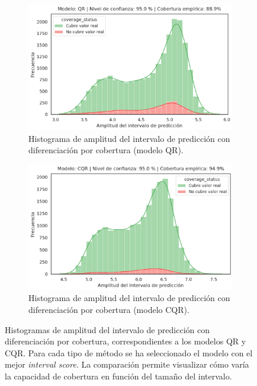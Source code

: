 \begin{figure}[htbp]
    \centering

    \begin{subfigure}[b]{0.8\textwidth}
        \centering
        \includegraphics[width=\textwidth]{capitulos/cap_05/imagenes/AE_histogram_EC_by_PIW_QR.png}
        \caption{
            Histograma de amplitud del intervalo de predicción con diferenciación por cobertura (modelo QR).
        }
        \label{fig:AE_EC_by_PIW_QR}
    \end{subfigure}

    \vspace{0.5cm}
    
    \begin{subfigure}[b]{0.8\textwidth}
        \centering
        \includegraphics[width=\textwidth]{capitulos/cap_05/imagenes/AE_histogram_EC_by_PIW_CQR.png}
        \caption{
            Histograma de amplitud del intervalo de predicción con diferenciación por cobertura (modelo CQR).
        }
        \label{fig:AE_EC_by_PIW_CQR}
    \end{subfigure}

    \caption[
        Histogramas del amplitud del intervalo de predicción con diferenciación por cobertura, correspondientes a los modelos QR y CQR.
    ]{
        Histogramas de amplitud del intervalo de predicción con diferenciación por cobertura, correspondientes a los modelos QR y CQR. 
        Para cada tipo de método se ha seleccionado el modelo con el mejor \textit{interval score}. La comparación permite visualizar cómo varía la capacidad de cobertura en función del tamaño del intervalo.
    }
    \label{fig:AE_EC_by_PIW}
\end{figure}

